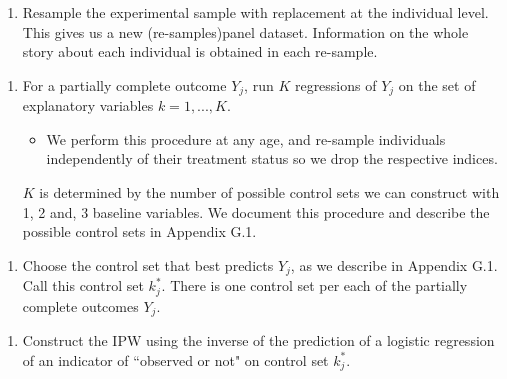 \documentclass[static]{JJH-Beamer}
\begin{document}
\clearpage
\begin{frame}

\begin{enumerate}[1.]
\item Resample the experimental sample with replacement at the individual level. This gives us a new (re-samples)panel dataset. Information on the whole story about each individual is obtained in each re-sample.
\end{enumerate}

\end{frame}

\begin{frame}

\begin{enumerate}[2.]
\item For a partially complete outcome $Y_{j}$, run $K$ regressions of $Y_{j}$ on the set of explanatory variables $k = 1,..., K$.
\begin{itemize}
\item We perform this procedure at any age, and re-sample individuals independently of their treatment status so we drop the respective indices.
\end{itemize}
$K$ is determined by the number of possible control sets we can construct with 1, 2 and, 3 baseline variables. We document this procedure and describe the possible control sets in Appendix G.1.
\end{enumerate}

\end{frame}

\begin{frame}

\begin{enumerate}[3.]
\item Choose the control set that best predicts $Y_{j}$, as we describe in Appendix G.1. Call this control set $k^*_{j}$. There is one control set per each of the partially complete outcomes $Y_{j}$.
\end{enumerate}

\end{frame}

\begin{frame}

\begin{enumerate}[4.]
\item Construct the IPW using the inverse of the prediction of  a logistic regression of an indicator of ``observed or not" on control set $k^*_{j}$.
\end{enumerate}

\end{frame}
\end{document}
